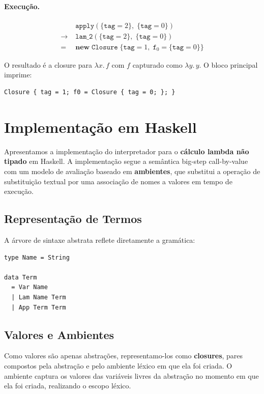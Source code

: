 \paragraph{Execução.}

\begin{align*}
  &\mathtt{apply}(\{\mathtt{tag}=2\},\;\{\mathtt{tag}=0\})
  \\
  \to\;&\mathtt{lam\_2}(\{\mathtt{tag}=2\},\;\{\mathtt{tag}=0\})
  \\
  =\;&\mathbf{new}\;\mathtt{Closure}\;\{\mathtt{tag}=1,\;
       \mathtt{f}_0=\{\mathtt{tag}=0\}\}
\end{align*}

O resultado é a closure para \(\lambda x.\, f\) com \(f\) capturado
como \(\lambda y.\, y\). O bloco principal imprime:
\begin{verbatim}
Closure { tag = 1; f0 = Closure { tag = 0; }; }
\end{verbatim}

\section{Implementação em Haskell}

Apresentamos a implementação do interpretador para o \textbf{cálculo
lambda não tipado} em Haskell. A implementação segue a semântica
big-step call-by-value com um modelo de avaliação baseado em
\textbf{ambientes}, que substitui a operação de substituição textual
por uma associação de nomes a valores em tempo de execução.

\subsection{Representação de Termos}

A árvore de sintaxe abstrata reflete diretamente a gramática:

\begin{verbatim}
type Name = String

data Term
  = Var Name
  | Lam Name Term
  | App Term Term
\end{verbatim}

\subsection{Valores e Ambientes}

Como valores são apenas abstrações, representamo-los como
\textbf{closures}, pares compostos pela abstração e pelo ambiente
léxico em que ela foi criada. O ambiente captura os valores das
variáveis livres da abstração no momento em que ela foi criada,
realizando o escopo léxico.

